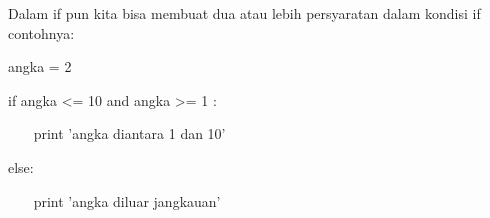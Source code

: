 \vspace{12pt}
\noindent 
Dalam if pun kita bisa membuat dua atau lebih persyaratan dalam kondisi $  $if $  $contohnya: \par
\vspace{12pt}
\noindent 
angka = 2 \par
\vspace{12pt}
\noindent 
if angka <= 10 and angka >= 1 : \par
\vspace{12pt}
\noindent 
~~~ print 'angka diantara 1 dan 10' \par
\vspace{12pt}
\noindent 
else: \par
\vspace{12pt}
\noindent 
~~~ print 'angka diluar jangkauan' \par
\vspace{12pt}
\vspace{12pt}

